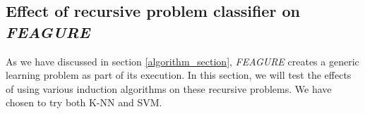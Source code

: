\documentclass{article}
\theoremstyle{definition}
\begin{document}
		
		
		
		
		
		

\subsection{Effect of recursive problem classifier on \emph{FEAGURE}}

As we have discussed in section \ref{algorithm_section}, \emph{FEAGURE} creates a generic learning problem as part of its execution. In this section, we will test the effects of using various induction algorithms on these recursive problems. We have chosen to try both K-NN and SVM.%
\end{document}
